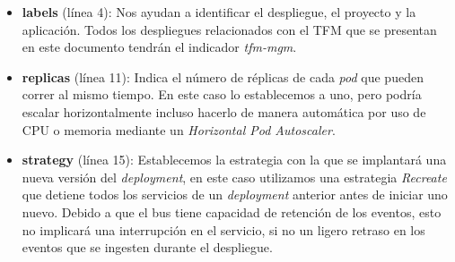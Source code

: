 \begin{itemize}
	\item \textbf{labels} (línea 4):  Nos ayudan a identificar el despliegue, el proyecto y la aplicación. Todos los despliegues relacionados con el TFM que se presentan en este documento tendrán el indicador \textit{tfm-mgm}. 

	\item \textbf{replicas} (línea 11): Indica el número de réplicas de cada \textit{pod} que pueden correr al mismo tiempo. En este caso lo establecemos a uno, pero podría escalar horizontalmente incluso hacerlo de manera automática por uso de CPU o memoria mediante un \textit{Horizontal Pod Autoscaler}. 



	\item \textbf{strategy} (línea 15): Establecemos la estrategia con la que se implantará una nueva versión del \textit{deployment}, en este caso utilizamos una estrategia \textit{Recreate} que detiene todos los servicios de un \textit{deployment} anterior antes de iniciar uno nuevo. Debido a que el bus tiene capacidad de retención de los eventos, esto no implicará una interrupción en el servicio, si no un ligero retraso en los eventos que se ingesten durante el despliegue.


\end{itemize}
